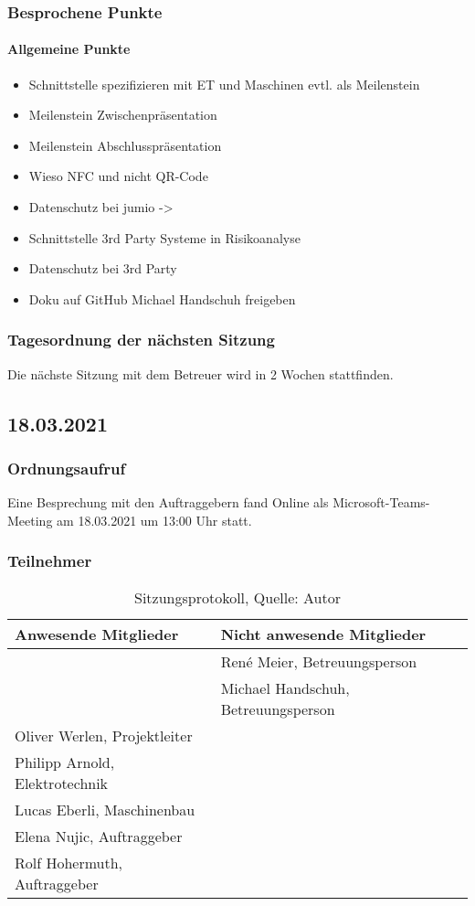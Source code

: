 \subsubsection{Besprochene Punkte}
\paragraph{Allgemeine Punkte}
\begin{itemize}
	\item Schnittstelle spezifizieren mit ET und Maschinen evtl. als Meilenstein
	\item Meilenstein Zwischenpräsentation
	\item Meilenstein Abschlusspräsentation
	\item Wieso NFC und nicht QR-Code
	\item Datenschutz bei jumio -> 
	\item Schnittstelle 3rd Party Systeme in Risikoanalyse
	\item Datenschutz bei 3rd Party
	\item Doku auf GitHub Michael Handschuh freigeben
\end{itemize}
\subsubsection{Tagesordnung der nächsten Sitzung}
Die nächste Sitzung mit dem Betreuer wird in 2 Wochen stattfinden. 
\subsection{18.03.2021}
\subsubsection{Ordnungsaufruf}
Eine Besprechung mit den Auftraggebern fand Online als Microsoft-Teams-Meeting am 18.03.2021 um 13:00 Uhr statt.
\subsubsection{Teilnehmer}
\begin{table}[H]
	\setlength\extrarowheight{2pt} %
	\begin{tabularx}{\textwidth}{|X|X|}
		\hline
		\textbf{Anwesende Mitglieder} &  \textbf{Nicht anwesende Mitglieder} \\
		\hline
		& René Meier, Betreuungsperson  \\
		& Michael Handschuh, Betreuungsperson   \\
		Oliver Werlen, Projektleiter &  \\
		Philipp Arnold, Elektrotechnik & \\
		Lucas Eberli, Maschinenbau & \\
		Elena Nujic, Auftraggeber & \\
		Rolf Hohermuth, Auftraggeber & \\
		\hline
	\end{tabularx}
	\caption{ \label{tbl: Teilnehmerliste vom 18.03.2021}Sitzungsprotokoll, Quelle: Autor}
\end{table}
